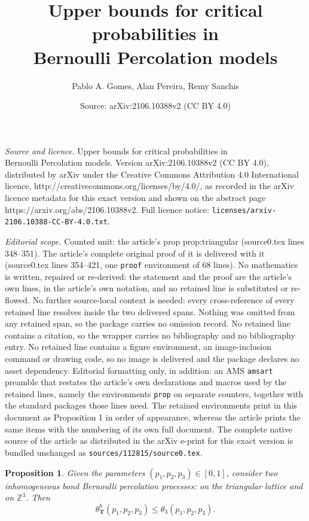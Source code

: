 \documentclass[10pt,a4paper]{amsart}
\title{Upper bounds for critical probabilities in \\ Bernoulli Percolation models}
\author{Pablo A. Gomes, Alan Pereira, Remy Sanchis}
\date{Source: arXiv:2106.10388v2 (CC BY 4.0)}
\newtheorem{prop}{Proposition}
\newcommand{\Z}{\mathbb{Z}}
\begin{document}
\maketitle

\noindent\emph{Source and licence.} Upper bounds for critical probabilities in \\ Bernoulli Percolation models. Version arXiv:2106.10388v2 (CC BY 4.0), distributed by arXiv under the Creative Commons Attribution 4.0 International licence, http://creativecommons.org/licenses/by/4.0/, as recorded in the arXiv licence metadata for this exact version and shown on the abstract page https://arxiv.org/abs/2106.10388v2. Full licence notice: \texttt{licenses/arxiv-2106.10388-CC-BY-4.0.txt}.\par\smallskip

\noindent\textit{Editorial scope.} Counted unit: the article's prop prop:triangular (source0.tex lines 348--351). The article's complete original proof of it is delivered with it (source0.tex lines 354--421, one \texttt{proof} environment of 68 lines). No mathematics is written, repaired or re-derived: the statement and the proof are the article's own lines, in the article's own notation, and no retained line is substituted or re-flowed.  No further source-local context is needed: every cross-reference of every retained line resolves inside the two delivered spans.  Nothing was omitted from any retained span, so the package carries no omission record.  No retained line contains a citation, so the wrapper carries no bibliography and no bibliography entry.  No retained line contains a figure environment, an image-inclusion command or drawing code, so no image is delivered and the package declares no asset dependency.  Editorial formatting only, in addition: an AMS \texttt{amsart} preamble that restates the article's own declarations and macros used by the retained lines, namely the environments \texttt{prop} on separate counters, together with the standard packages those lines need.  The retained environments print in this document as Proposition 1 in order of appearance, whereas the article prints the same items with the numbering of its own full document.  The complete native source of the article as distributed in the arXiv e-print for this exact version is bundled unchanged as \texttt{sources/112815/source0.tex}.
\begin{prop}\label{prop:triangular}
Given the parameters $(p_1,p_2,p_3)\in [0,1]$, consider two inhomogeneous bond Bernoulli percolation processes: on the triangular lattice  and on $\Z^3$. Then
\[\theta^b_{\mathbf{T}}(p_1,p_2,p_3)\leq\theta_3(p_1,p_2,p_3).\]
\end{prop}
\end{document}
